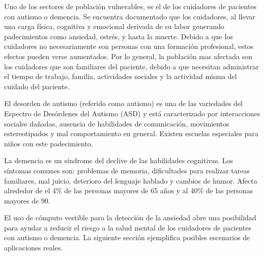 \documentclass[letterpaper,12pt]{cicese}
\begin{document}
			Uno de los sectores de poblaci\'on vulnerables, es el de los cuidadores de pacientes con autismo o demencia. Se encuentra documentado que los cuidadores, al llevar una carga f\'isica, cognitiva y emocional derivada de su labor generando padecimientos como ansiedad, estr\'es, y hasta la muerte\citep{Chen2013}. Debido a que los cuidadores no necesariamente son personas con una formaci\'on profesional, estos efectos pueden verse aumentados. Por lo general, la poblaci\'on mas afectada son los cuidadores que son familiares del paciente, debido a que necesitan administrar el tiempo de trabajo, familia, actividades sociales y la actividad misma del cuidado del paciente.

			El desorden de autismo (referido como autismo) es una de las variedades del Espectro de Des\'ordenes del Autismo (ASD) y est\'a caracterizado por interacciones sociales da\~nadas, ausencia de habilidades de comunicaci\'on, movimientos estereotipados y mal comportamiento en general\citep{bernier2010autism}. Existen escuelas especiales para ni\~nos con este padecimiento. 

La demencia es un s\'indrome del declive de las habilidades cognitivas. Los s\'intomas comunes son: problemas de memoria, dificultades para realizar tareas familiares, mal juicio, deterioro del lenguaje hablado y cambios de humor\citep{Aziz}. Afecta alrededor de el 4\% de las personas mayores de 65 a\~nos y al 40\% de las personas mayores de 90. 

			El uso de c\'omputo vestible para la detecci\'on de la ansiedad abre una posibilidad para ayudar a reducir el riesgo a la salud mental
			de los cuidadores de pacientes con autismo o demencia. La siguiente secci\'on ejemplifica posibles escenarios de aplicaciones reales.
\end{document}
